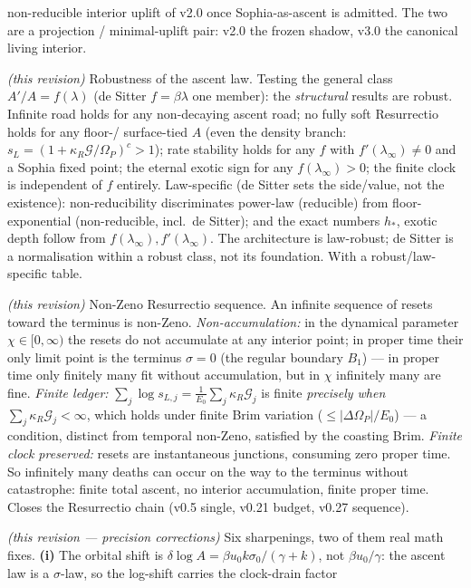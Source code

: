 \documentclass[11pt,a4paper]{article}
\theoremstyle{plain}
\theoremstyle{definition}
\theoremstyle{remark}
\begin{document}
\begin{description}[leftmargin=4.2em,style=nextline,itemsep=2pt]
{non-reducible interior uplift} of v2.0 once Sophia-as-ascent is admitted. The two are a projection /
minimal-uplift pair: v2.0 the frozen shadow, v3.0 the canonical living interior.
\item[\textbf{v0.26}] \emph{(this revision)} Robustness of the ascent law. Testing the general class
$A'/A=f(\lambda)$ (de Sitter $f=\beta\lambda$ one member): the \emph{structural} results are robust.
Infinite road holds for any non-decaying ascent road; no fully soft Resurrectio holds for any floor-/
surface-tied $A$ (even the density branch: $s_L=(1+\kappa_R\mathcal G/\Omega_P)^c>1$); rate stability
holds for any $f$ with $f'(\lambda_\infty)\neq0$ and a Sophia fixed point; the eternal exotic sign for
any $f(\lambda_\infty)>0$; the finite clock is independent of $f$ entirely. Law-specific (de Sitter sets
the side/value, not the existence): non-reducibility discriminates power-law (reducible) from
floor-exponential (non-reducible, incl.\ de Sitter); and the exact numbers $h_*$, exotic depth follow
from $f(\lambda_\infty),f'(\lambda_\infty)$. The architecture is law-robust; de Sitter is a
normalisation within a robust class, not its foundation. With a robust/law-specific table.
\item[\textbf{v0.27}] \emph{(this revision)} Non-Zeno Resurrectio sequence. An infinite sequence of
resets toward the terminus is non-Zeno. \emph{Non-accumulation:} in the dynamical parameter
$\chi\in[0,\infty)$ the resets do not accumulate at any interior point; in proper time their only limit
point is the terminus $\sigma=0$ (the regular boundary $B_1$) --- in proper time only finitely many fit
without accumulation, but in $\chi$ infinitely many are fine. \emph{Finite ledger:} $\sum_j\log
s_{L,j}=\frac1{E_0}\sum_j\kappa_R\mathcal G_j$ is finite \emph{precisely when} $\sum_j\kappa_R\mathcal
G_j<\infty$, which holds under finite Brim variation ($\le|\Delta\Omega_P|/E_0$) --- a condition,
distinct from temporal non-Zeno, satisfied by the coasting Brim. \emph{Finite clock preserved:} resets
are instantaneous junctions, consuming
zero proper time. So infinitely many deaths can occur on the way to the terminus without catastrophe:
finite total ascent, no interior accumulation, finite proper time. Closes the Resurrectio chain (v0.5
single, v0.21 budget, v0.27 sequence).
\item[\textbf{v0.28}] \emph{(this revision --- precision corrections)} Six sharpenings, two of them
real math fixes. \textbf{(i)} The orbital shift is $\delta\log A=\beta u_0k\sigma_0/(\gamma+k)$, not
$\beta u_0/\gamma$: the ascent law is a $\sigma$-law, so the log-shift carries the clock-drain factor

\end{description}
\end{document}
